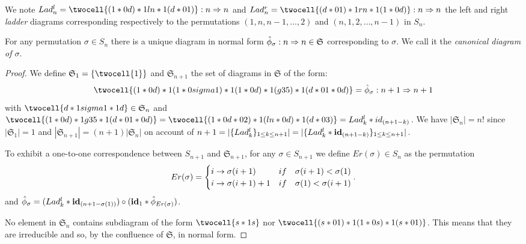 \documentclass[a4paper]{article}
\begin{document}
\nota  We note $Lad^l_n= \twocell{ (1*0 d) *1 ln *1 (d*0 1) }: n\frr n $ and $Lad^r_n= \twocell{(d*0 1) *1 rn *1 (1*0 d) }:n\frr n$ the left and right \emph{ladder} diagrams corresponding respectively to the permutations $(1,n,n-1, \dots , 2)$ and $(n,1,2, \dots, n-1)$ in $S_n$.



\begin{proposition}\label{corrPer}
For any permutation $\sigma\in S_n$ there is a unique diagram in normal form $\hat \phi_\sigma: n\Rightarrow n \in \mathfrak S$ corresponding to $\sigma$. We call it the \emph{canonical diagram of $\sigma$}.
\begin{proof}
We define $\mathfrak S_1=\{\twocell{1}\}$ and $\mathfrak S_{n+1}$ the set of diagrams in $ \mathfrak S$ of the form:
$$\twocell{(1 *0 d) *1 (1 *0 sigma1) *1 (1 *0 d) *1 (g35) *1 (d *0 1 *0 d)}=\hat\phi_\sigma: n+1\frr n+1 $$
with $\twocell{ d *1 sigma1 *1 d} \in \mathfrak S_{n}$ and $\twocell{(1 *0 d)*1 g35 *1 (d *0 1 *0 d)} = \twocell{(1 *0 d *0 2)*1 (ln *0 d) *1( d *0 3)}= Lad^l_k * id_{(n+1-k)}$. 
We have $|\mathfrak S_n|=n!$ since $|\mathfrak S_1|=1$ and  $|\mathfrak S_{n+1}|=(n+1)|\mathfrak S_{n}| $ on account of $n+1=|\{Lad^l_k\}_{1\leq k\leq n+1}|=|\{Lad^l_k* \textbf{id}_{(n+1-k)}\}_{1\leq k\leq n+1}|$.


To exhibit a one-to-one correspondence between $S_{n+1}$ and $\mathfrak S_{n+1}$, for any $\sigma \in S_{n+1}$ we define $Er(\sigma)\in S_n$ as the permutation
$$Er(\sigma)=\begin{cases}i \rightarrow \sigma(i+1) & {if }\quad \sigma (i+1)<\sigma (1) \\ i \rightarrow \sigma(i+1)+1 & {if }\quad \sigma (1)<\sigma (i+1)\end{cases}.$$
and $\hat \phi _\sigma=( Lad^l_k* \textbf{id}_{(n+1-\sigma(1))}) \circ (\textbf{id}_1 * \hat \phi _{Er(\sigma)})$.

No element in $\mathfrak S_n$ contains subdiagram of the form $\twocell{s *1 s}$ nor $\twocell{(s *0 1) *1 (1 *0 s) *1 (s *0 1)}$. This means that they are irreducible and so, by the confluence of $\mathfrak S$, in normal form.
\end{proof}
\end{proposition}
\end{document}
